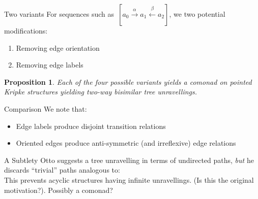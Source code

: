 \documentclass{beamer}
\newtheorem{proposition}{Proposition}
\begin{document}
\begin{frame}{Two variants}
    For sequences such as~$[a_0 \xrightarrow{\alpha} a_1 \xleftarrow{\beta} a_2]$,
    we two potential modifications:
    \begin{enumerate}
        \item Removing edge orientation
        \item Removing edge labels
    \end{enumerate}
    \begin{proposition}
    Each of the four possible variants yields a comonad on pointed Kripke structures yielding two-way bisimilar tree unravellings.
    \end{proposition}
    \begin{block}{Comparison}
    We note that:
    \begin{itemize}
        \item Edge labels produce disjoint transition relations
        \item Oriented edges produce anti-symmetric (and irreflexive) edge relations
    \end{itemize}
    \end{block}
\end{frame}

\begin{frame}{A Subtlety}
Otto suggests a tree unravelling in terms of undirected paths, \emph{but} he discards ``trivial'' paths analogous to:
\begin{equation*}
    [a \rightarrow b \leftarrow a]
\end{equation*}
This prevents acyclic structures having infinite unravellings. (Is this the original motivation?).
\pause
Possibly a comonad?
\end{frame}
\end{document}
